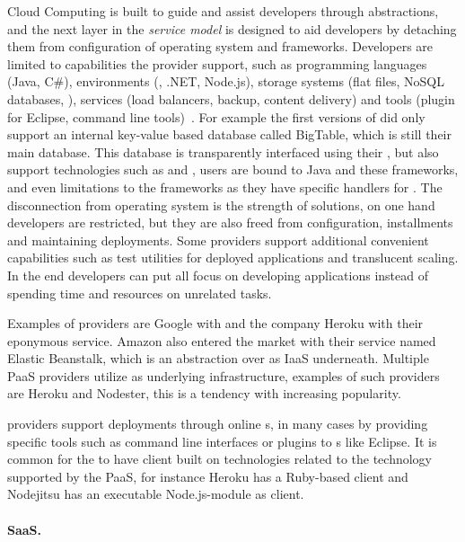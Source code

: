 Cloud Computing is built to guide and assist developers through abstractions, and the next
layer in the \emph{service model} is designed to aid developers by detaching them
from configuration of operating system and frameworks.
Developers are limited to capabilities the provider support,
such as programming languages (\eg Java, C\#), environments (\eg {}, .NET, Node.js), 
storage systems (\eg flat files, NoSQL databases, ),
services (\eg load balancers, backup, content delivery)
and tools (\eg plugin for Eclipse, command line tools)~\cite{nist:mell11}.
For example the first versions of  did only support
an internal key-value based database called BigTable, which is still their main database.
This database is transparently interfaced using their , 
but also support technologies such as  and ,
users are bound to Java and these frameworks, and even limitations to the frameworks
as they have specific handlers for .
The disconnection from operating system is the strength of  solutions,
on one hand developers are restricted, but they are also freed from
configuration, installments and maintaining deployments.
Some  providers support additional convenient capabilities such as
test utilities for deployed applications and translucent scaling.
In the end developers can put all focus on developing applications 
instead of spending time and resources on unrelated tasks.

Examples of  providers are Google with  and
the company Heroku with their eponymous service.
Amazon also entered the  market with their service named Elastic Beanstalk,
which is an abstraction over  as IaaS underneath.
Multiple PaaS providers utilize  as underlying infrastructure, examples of such
providers are Heroku and Nodester, this is a tendency with increasing popularity.

 providers support deployments through online s, in many cases by providing 
specific tools such as command line interfaces or plugins to s like Eclipse.
It is common for the  to have client built on technologies related to the technology supported by the PaaS,
for instance Heroku has a Ruby-based client and Nodejitsu has an executable Node.js-module as client.


\paragraph{SaaS.}

